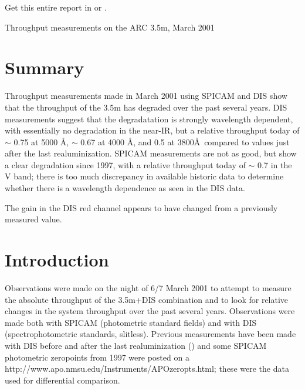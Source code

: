 \documentclass{article}
\begin{document}
\begin{htmlonly}
Get this entire report in 
or .
\end{htmlonly}

\begin{center}
\begin{LARGE}
Throughput measurements on the ARC 3.5m, March 2001
\end{LARGE}
\end{center}

\section{Summary}

Throughput measurements made in March 2001 using SPICAM and DIS show that
the throughput of the 3.5m has degraded over the past several years. DIS
measurements suggest that the degradatation is strongly wavelength 
dependent, with essentially no degradation in the near-IR, but a relative
throughput today of $\sim$ 0.75 at 5000 \AA, $\sim$ 0.67 at 4000 \AA,
and 0.5 at 3800\AA\  compared to values just after the last realuminization.
SPICAM measurements are not as good, but show a clear degradation since
1997, with a relative throughput today of $\sim$ 0.7 in the V band; there
is too much discrepancy in available historic data to determine whether
there is a wavelength dependence as seen in the DIS data.

The gain in the DIS red channel appears to have changed from a previously
measured value.

\section{Introduction}

Observations were made on the night of 6/7 March 2001 to attempt to measure
the absolute throughput of the 3.5m+DIS combination and to look for relative
changes in the system throughput over the past several
years. Observations were made both with SPICAM (photometric
standard fields) and with DIS (spectrophotometric standards,
slitless). Previous measurements have been made with DIS before
and after the last realuminization ()
and some SPICAM photometric zeropoints from 1997 were
posted on a 
{http://www.apo.nmsu.edu/Instruments/APOzeropts.html}; these were the
data used for differential comparison.
\end{document}
